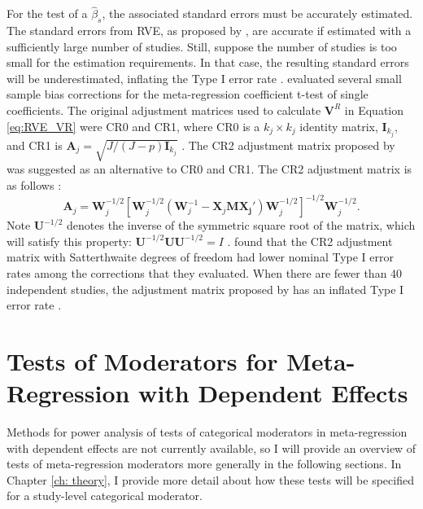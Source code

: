 For the test of a $\hat{\beta}_s$, the associated standard errors must be accurately estimated. The standard errors from RVE, as proposed by \textcite{hedges2010}, are accurate if estimated with a sufficiently large number of studies. Still, suppose the number of studies is too small for the estimation requirements. In that case, the resulting standard errors will be underestimated, inflating the Type I error rate \autocite{tipton2015a}. \textcite{tipton2015a} evaluated several small sample bias corrections for the meta-regression coefficient t-test of single coefficients. The original adjustment matrices used to calculate $\mathbf{V}^R$ in Equation \ref{eq:RVE_VR} were CR0 and CR1, where CR0 is a $k_j \times k_j$ identity matrix, $\mathbf{I}_{k_j}$, and CR1 is $\mathbf{A}_j = \sqrt{J/(J-p)\mathbf{I}_{k_j}}$ \autocite{hedges2010, tipton2015a}. The CR2 adjustment matrix proposed by \textcite{mccaffrey2001} was suggested as an alternative to CR0 and CR1. The CR2 adjustment matrix is as follows \autocite[See Eq. 4 in][]{tipton2015b}:
\begin{equation}\label{adjustment}
    \mathbf{A}_j = \mathbf{W}_j^{-1/2}[\mathbf{W}_j^{-1/2}(\mathbf{W}_j^{-1}-\mathbf{X}_j\mathbf{M\mathbf{X}_j'})\mathbf{W}_j^{-1/2}]^{-1/2}\mathbf{W}_j^{-1/2}.
\end{equation}
Note $\mathbf{U}^{-1/2}$ denotes the inverse of the symmetric square root of the matrix, which will satisfy this property: $\mathbf{U}^{-1/2}\mathbf{U}\mathbf{U}^{-1/2}= I$ \autocite{tipton2015b}. \textcite{tipton2015a} found that the CR2 adjustment matrix with Satterthwaite degrees of freedom \autocite{mccaffrey2001} had lower nominal Type I error rates among the corrections that they evaluated. When there are fewer than 40 independent studies, the adjustment matrix proposed by \textcite{hedges2010} has an inflated Type I error rate \autocite{tipton2015a}.

\section{Tests of Moderators for Meta-Regression with Dependent Effects}

Methods for power analysis of tests of categorical moderators in meta-regression with dependent effects are not currently available, so I will provide an overview of tests of meta-regression moderators more generally in the following sections. In Chapter \ref{ch: theory}, I provide more detail about how these tests will be specified for a study-level categorical moderator. 

